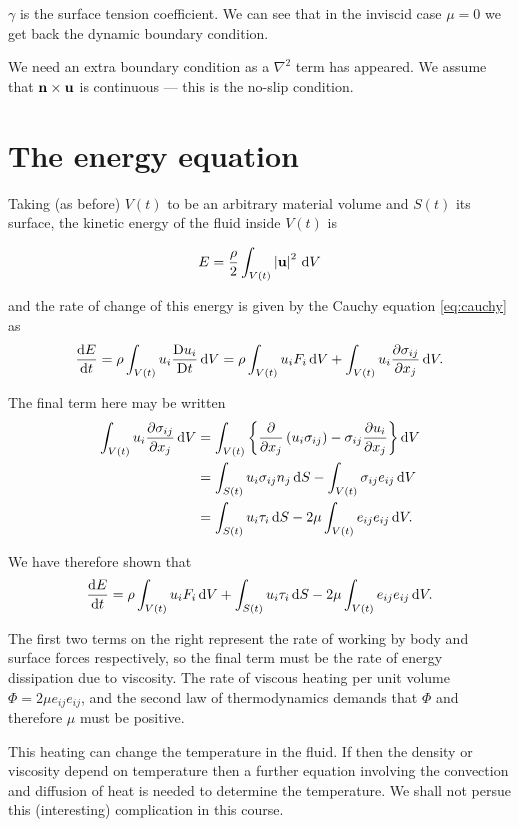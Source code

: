 \documentclass{notes}
\theoremstyle{plain}
\begin{document}
$\gamma$ is the surface tension coefficient.  We can see that
in the inviscid case $\mu = 0$ we get back the dynamic boundary condition.

We need an extra boundary condition as a $\nabla^2$ term has appeared.
We assume that $\mathbf{n} \times \mathbf{u}$ is continuous --- this is the no-slip condition.

\section{The energy equation}

Taking (as before) $V(t)$ to be an arbitrary material volume and
$S(t)$ its surface, the kinetic energy of the fluid inside $V(t)$ is

\[
E = \frac{\rho}{2} \int_{V(t)} \left|\mathbf{u}\right|^2\, \mathrm{d} V
\]

and the rate of change of this energy is given by the Cauchy equation
\eqref{eq:cauchy} as
\[
\frac{\mathrm{d} E}{\mathrm{d} t} = \rho \int_{V(t)} u_i \frac{\mathrm{D} u_i}{\mathrm{D} t}\, \mathrm{d} V
= \rho \int_{V(t)} u_i F_i\, \mathrm{d} V + \int_{V(t)} u_i \frac{\partial \sigma_{i j}}{\partial x_j}\,
\mathrm{d} V.
\]

The final term here may be written
\begin{align*}
\int_{V(t)} u_i \frac{\partial \sigma_{i j}}{\partial x_j}\, \mathrm{d} V &=
\int_{V(t)} \left\{ \frac{\partial }{\partial x_j} \left(u_i \sigma_{i j}\right)
- \sigma_{i j} \frac{\partial u_i}{\partial x_j} \right\}\mathrm{d} V \\
&= \int_{S(t)} u_i \sigma_{i j} n_j\, \mathrm{d} S
- \int_{V(t)} \sigma_{i j} e_{i j}\, \mathrm{d} V \\
&= \int_{S(t)} u_i \tau_i\, \mathrm{d} S - 2 \mu \int_{V(t)} e_{ij} e_{ij}\, \mathrm{d} V.
\end{align*}

We have therefore shown that
\[
\frac{\mathrm{d} E}{\mathrm{d} t} = \rho \int_{V(t)} u_i F_i\, \mathrm{d} V + \int_{S(t)} u_i \tau_i\,
\mathrm{d} S - 2 \mu \int_{V(t)} e_{i j} e_{i j}\, \mathrm{d} V.
\]

The first two terms on the right represent the rate of working by body and
surface forces respectively, so the final term must be the rate of energy
dissipation due to viscosity.  The rate of viscous heating
per unit volume $\Phi = 2 \mu e_{i j} e_{i j}$, and the second
law of thermodynamics demands that $\Phi$ and therefore $\mu$ must be
positive.

This heating can change the temperature in the fluid.  If then the
density or viscosity depend on temperature then a further equation involving
the convection and diffusion of heat is needed to determine the temperature.
We shall not persue this (interesting) complication in this course.
\end{document}
